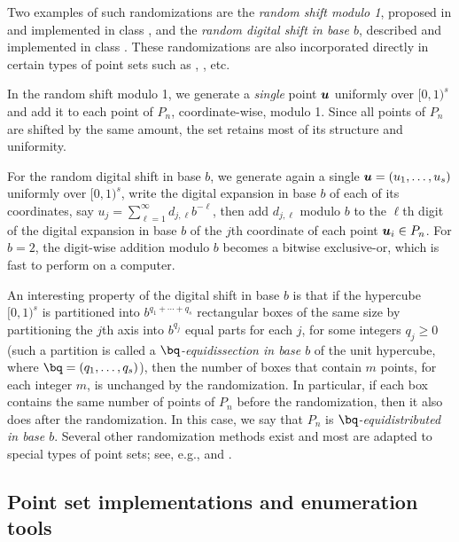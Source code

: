 Two examples of such randomizations are the \emph{random shift modulo 1},
proposed in \cite{vCRA76a} and implemented in class
,
and the \emph{random digital shift in base $b$}, described and
implemented in class .
These randomizations are also incorporated directly in certain types
of point sets such as
,
, etc.

In the random shift modulo 1, we generate a \emph{single} point $\mbox{\boldmath $u$}$
uniformly over $[0,1)^s$ and add it to each point of $P_n$,
coordinate-wise, modulo 1.
Since all points of $P_n$ are shifted by the same amount,
the set retains most of its structure and uniformity.

For the random digital shift in base $b$, we generate again a single
$\mbox{\boldmath $u$} = (u_1,\dots,u_s)$ uniformly over $[0,1)^s$,
write the digital expansion in base $b$ of each of its coordinates,
say $u_j = \sum_{\ell=1}^\infty d_{j,\ell} b^{-\ell}$,
then add $d_{j,\ell}$ modulo $b$ to the $\ell$th digit of the
digital expansion in base $b$ of the $j$th coordinate of each point
$\mbox{\boldmath $u$}_i\in P_n$.  For $b=2$, the digit-wise addition modulo $b$ becomes
a bitwise exclusive-or, which is fast to perform on a computer.

An interesting property of the digital shift in base $b$ is that
if the hypercube $[0,1)^s$ is partitioned into $b^{q_1 + \cdots + q_s}$
rectangular boxes
of the same size by partitioning the $j$th axis into $b^{q_j}$ equal
parts for each $j$, for some integers $q_j \ge 0$
(such a partition is called a \emph{$\bq$-equidissection in base $b$}
of the unit hypercube, where $\bq = (q_1,\dots,q_s)$),  then the number of
boxes that contain $m$ points, for each integer $m$, is unchanged by
the randomization.  In particular, if each box contains the same number
of points of $P_n$ before the randomization, then it also does after the
randomization.
In this case, we say that $P_n$ is \emph{$\bq$-equidistributed in base $b$}.
Several other randomization methods exist and most are adapted to
special types of point sets; see, e.g.,
  and \cite{vOWE03a}.


\subsection*{Point set implementations and enumeration tools}

